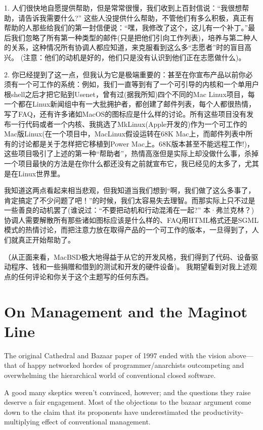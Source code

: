 \documentclass[a4paper,12pt,UTF8,twoside]{ctexbook}
\begin{document}
1. 人们很快地自愿提供帮助，但是常常很慢，我们收到上百封信说：“我很想帮助，请告诉我需要什么?” 这些人没提供什么帮助，不管他们有多么积极，真正有帮助的人那些给我们的第一封信便说：“嘿，我修改了这个，这儿有一个补丁。”最后我们忽略了所有第一种类型的邮件(只是把他们引向工作列表)，培养与第二种人的关系，这种情况所有协调人都应知道，来克服看到这么多“志愿者”时的盲目高兴。
(注意：他们的动机是好的，他们只是没有认识到他们正在志愿做什么)。


2. 你已经提到了这一点，但我认为它是极端重要的：甚至在你宣布产品以前你必须有一个可工作的系统：例如，我们一直等到有了一个可引导的内核和一个单用户根shell之后才把它贴到Usenet，曾有过(据我所知)四个不同的Mac Linux项目，每一个都在Linux新闻组中有一大批拥护者，都创建了邮件列表，每个人都很热情，写了FAQ，还有许多诸如MacOS的图标应是什么样的讨论。所有这些项目没有发布一行代码或者一个内核、我挑选了MkLinux(Apple开发的)作为一个可工作的Mac版Linux(在一个项目中，MacLinux假设运转在68K Mac上，而邮件列表中所有的讨论都是关于怎样把它移植到Power Mac上。68K版本甚至不能远程工作!)，这些项目吸引了上述的第一种“帮助者”，热情高涨但是实际上却没做什么事，杀掉一个项目最快的方法是在你什么都还没有之前就宣布它，我已经见的太多了，尤其是在Linux世界里。

我知道这两点看起来相当悲观，但我知道当我们想到“啊，我们做了这么多事了，肯定搞定了不少问题了吧！”的时候，我们太容易失去理智。而那实际上只不过是一些善良的动机罢了(谁说过：“不要把动机和行动混淆在一起?” 本·弗兰克林？)协调人需要解散所有那些诸如图标应该是什么样的、FAQ用HTML格式还是SGML模式的热情讨论，而把注意力放在取得产品的一个可工作的版本，一旦得到了，人们就真正开始帮助了。

（从正面来看，MacBSD极大地得益于从它的开发风格，我们得到了代码、设备驱动程序、钱和一些捐赠和借到的测试和开发的硬件设备)。
我期望看到对我上述观点的任何评论和你关于这个主题写的任何东西。

\chapter{On Management and the Maginot Line}

The original Cathedral and Bazaar paper of 1997 ended with the vision above—that of happy networked hordes of programmer/anarchists outcompeting and overwhelming the hierarchical world of conventional closed software.

A good many skeptics weren't convinced, however; and the questions they raise deserve a fair engagement. Most of the objections to the bazaar argument come down to the claim that its proponents have underestimated the productivity-multiplying effect of conventional management.
\end{document}
